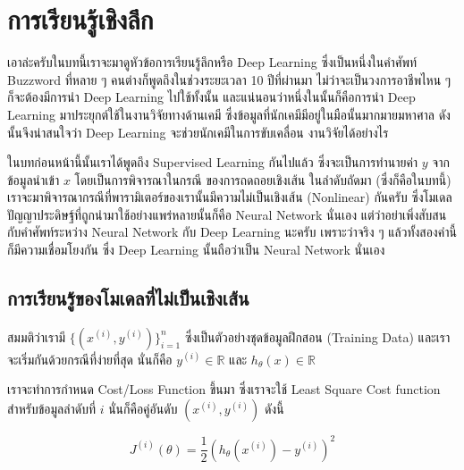 

\chapter{การเรียนรู้เชิงลึก}
\label{ch:dl}

เอาล่ะครับในบทนี้เราจะมาดูหัวข้อการเรียนรู้ลึกหรือ Deep Learning ซึ่งเป็นหนึ่งในคำศัพท์ Buzzword ที่หลาย ๆ คนต่างก็พูดถึงในช่วงระยะเวลา
10 ปีที่ผ่านมา ไม่ว่าจะเป็นวงการอาชีพไหน ๆ ก็จะต้องมีการนำ Deep Learning ไปใช้ทั้งนั้น และแน่นอนว่าหนึ่งในนั้นก็คือการนำ Deep Learning 
มาประยุกต์ใช้ในงานวิจัยทางด้านเคมี ซึ่งข้อมูลที่นักเคมีมีอยู่ในมือนั้นมากมายมหาศาล ดังนั้นจึงน่าสนใจว่า Deep Learning จะช่วยนักเคมีในการขับเคลื่อน%
งานวิจัยได้อย่างไร

ในบทก่อนหน้านี้นั้นเราได้พูดถึง Supervised Learning กันไปแล้ว ซึ่งจะเป็นการทำนายค่า $y$ จากข้อมูลนำเข้า $x$ โดยเป็นการพิจารณาในกรณี%
ของการถดถอยเชิงเส้น ในลำดับถัดมา (ซึ่งก็คือในบทนี้) เราจะมาพิจารณากรณีที่พารามิเตอร์ของเรานั้นมีความไม่เป็นเชิงเส้น (Nonlinear) กันครับ
ซึ่งโมเดลปัญญาประดิษฐ์ที่ถูกนำมาใช้อย่างแพร่หลายนั้นก็คือ Neural Network นั่นเอง แต่ว่าอย่าเพิ่งสับสนกับคำศัพท์ระหว่าง Neural Network กับ
Deep Learning นะครับ เพราะว่าจริง ๆ แล้วทั้งสองคำนี้ก็มีความเชื่อมโยงกัน ซึ่ง Deep Learning นั้นถือว่าเป็น Neural Network นั่นเอง

\section{การเรียนรู้ของโมเดลที่ไม่เป็นเชิงเส้น}
\label{sec:nonlinear_ml}

สมมติว่าเรามี $\{(x^{(i)}, y^{(i)})\}^n_{i=1}$ ซึ่งเป็นตัวอย่างชุดข้อมูลฝึกสอน (Training Data) และเราจะเริ่มกันด้วยกรณีที่ง่ายที่สุด%
นั่นก็คือ $y^{(i)} \in \mathbb{R}$ และ $h_\theta(x) \in \mathbb{R}$ 

เราจะทำการกำหนด Cost/Loss Function ขึ้นมา ซึ่งเราจะใช้ Least Square Cost function สำหรับข้อมูลลำดับที่ $i$ นั่นก็คือคู่อันดับ 
$(x^{(i)} ,y^{(i)} )$ ดังนี้ 

\begin{equation}\label{eq:loss}
    J^{(i)} (\theta) = \frac{1}{2} \left(h_\theta (x^{(i)}) - y^{(i)}\right)^2
\end{equation}

